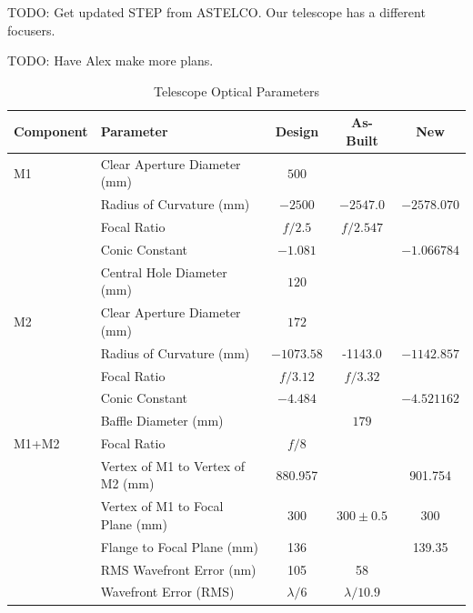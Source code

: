 TODO: Get updated STEP from ASTELCO. Our telescope has a different focusers.

TODO: Have Alex make more plans.

\begin{table}
\caption{Telescope Optical Parameters}
\label{table:telescope-optical-parameters}
\medskip
\footnotesize
\begin{tabular}{llccc}
\hline
\hline
Component&Parameter&Design&As-Built&New\\
\hline
M1
&Clear Aperture Diameter (mm)     &\phantom{$+0$}$500$\phantom{.000}\\
&Radius of Curvature (mm)         &\phantom{}$-2500$\phantom{.000}&$-2547.0$&$-2578.070$\\
&Focal Ratio                      &$f/2.5$&$f/2.547$\\
&Conic Constant                   &\phantom{$000$}$-1.081$\phantom{}&&$-1.066784$\\
&Central Hole Diameter (mm)       &\phantom{$+0$}$120$\phantom{.000}\\
\hline
M2
&Clear Aperture Diameter (mm)     &\phantom{$+0$}$172$\phantom{.000}\\
&Radius of Curvature (mm)         &\phantom{}$-1073.58$\phantom{0}&-1143.0\phantom{}&$-1142.857$\\
&Focal Ratio                      &$f/3.12$&$f/3.32$\\
&Conic Constant                   &\phantom{$000$}$-4.484$&&$-4.521162$\\
&Baffle Diameter (mm)             &&\phantom{$+0$}$179$\phantom{.000}\\
\hline

M1+M2
&Focal Ratio&$f/8$&\\
&Vertex of M1 to Vertex of M2 (mm)&\phantom{$+0$}880.957\phantom{}&&901.754\phantom{}\\
&Vertex of M1 to Focal Plane (mm) &\phantom{$+0$}300\phantom{.000}&$300\pm0.5$&300\phantom{.000}\\
&Flange to Focal Plane (mm)       &\phantom{$+0$}136\phantom{.000}&&139.35\phantom{0}\\
&RMS Wavefront Error (nm)         &\phantom{$+0$}105\phantom{.000}&\phantom{$+00$}58\phantom{.000}\\
&Wavefront Error (RMS)            &$\lambda/6$&$\lambda/10.9$\\
\hline
\end{tabular}
\end{table}

